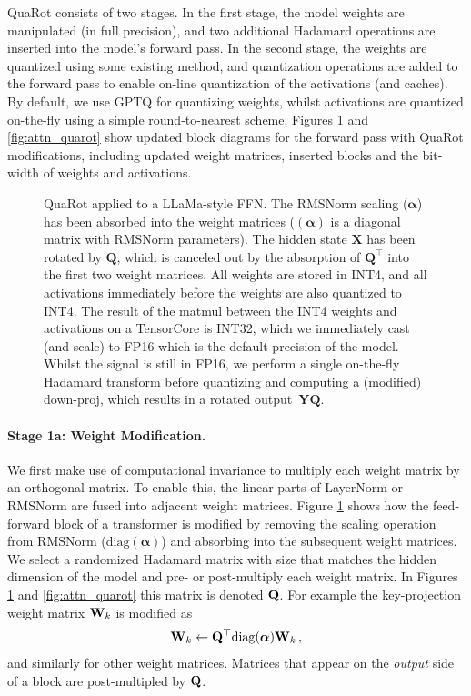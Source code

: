 QuaRot consists of two stages. In the first stage, the model weights are manipulated (in full precision), and two additional Hadamard operations are inserted into the model's forward pass. In the second stage, the weights are quantized using some existing method, and quantization operations are added to the forward pass to enable on-line quantization of the activations (and caches). By default, we use GPTQ \citep{gptq} for quantizing weights, whilst activations are quantized on-the-fly using a simple round-to-nearest scheme. Figures \ref{fig:ffn_quarot} and \ref{fig:attn_quarot} show updated block diagrams for the forward pass with QuaRot modifications, including updated weight matrices, inserted blocks and the bit-width of weights and activations. 
%
\begin{figure}
    \centering
    \scalebox{0.7}{}
    \caption{QuaRot applied to a LLaMa-style FFN. The RMSNorm scaling ($\boldsymbol\alpha$) has been absorbed into the weight matrices ($(\boldsymbol\alpha)$ is a diagonal matrix with RMSNorm parameters). The hidden state $\mathbf{X}$ has been rotated by $\mathbf{Q}$, which is canceled out by the absorption of $\mathbf{Q}^\top$ into the first two weight matrices. All weights are stored in INT4, and all activations immediately before the weights are also quantized to INT4. The result of the matmul between the INT4 weights and activations on a TensorCore is INT32, which we immediately cast (and scale) to FP16 which is the default precision of the model. Whilst the signal is still in FP16, we perform a single on-the-fly Hadamard transform before quantizing and computing a (modified) down-proj, which results in a rotated output~$\mathbf{YQ}$. }
    \label{fig:ffn_quarot}
\end{figure}
%
\vspace{-0.5em}

\paragraph{Stage 1a: Weight Modification.}
We first make use of computational invariance to multiply each weight matrix by an orthogonal matrix. To enable this, the linear parts of LayerNorm or RMSNorm are fused into adjacent weight matrices. Figure \ref{fig:ffn_quarot} shows how the feed-forward block of a transformer is modified by removing the scaling operation from RMSNorm ($\textrm{diag}(\boldsymbol\alpha)$) and absorbing into the subsequent weight matrices. We select a randomized Hadamard matrix with size that matches the hidden dimension of the model and pre- or post-multiply each weight matrix. In Figures \ref{fig:ffn_quarot} and \ref{fig:attn_quarot} this matrix is denoted ${\mathbf{Q}}$. For example the key-projection weight matrix ${\mathbf{W}}_k$ is modified as
\begin{equation}
    {\mathbf{W}}_k \leftarrow {\mathbf{Q}}^\top \textrm{diag}(\boldsymbol\alpha) {\mathbf{W}}_k\,,
\end{equation}
and similarly for other weight matrices. Matrices that appear on the \emph{output} side of a block are post-multipled by ${\mathbf{Q}}$. 

